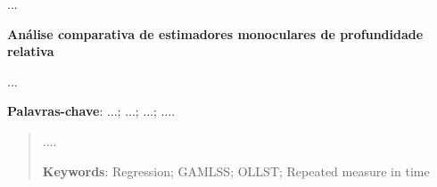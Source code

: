 	...
	
	\begin{resumo}
	
	  \begin{center}{
	    \textbf{Análise comparativa de estimadores monoculares de profundidade relativa}}
	  \end{center}
	
	\begin{spacing}{1.0}
	  ...
	\end{spacing}
	{\hspace{-8mm} \bf{Palavras-chave}}: ...; ...; ...; ....
	
	\end{resumo}
	
	\begin{abstract}
	
	....
	
	{\hspace{-8mm} \bf{Keywords}}: Regression; GAMLSS; OLLST; Repeated measure in time
	
	\end{abstract}
	
	\listoffigures
	
	\cleardoublepage
	\listoftables
	\cleardoublepage
	
	\pagestyle{ruledheader}
	\tableofcontents